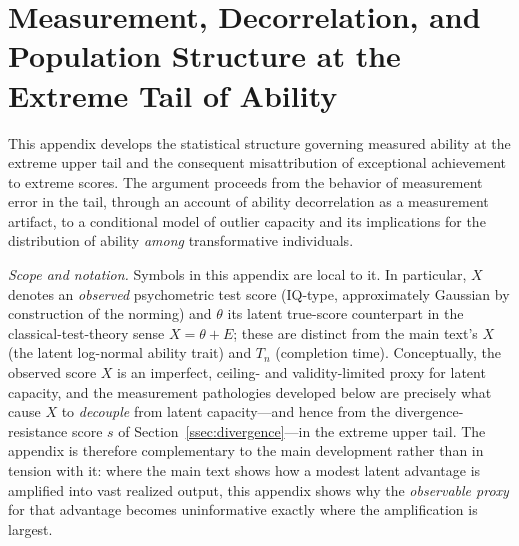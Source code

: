 \documentclass{article}
\begin{document}
\printbibliography

\appendix

\section{Measurement, Decorrelation, and Population Structure at the Extreme Tail of Ability}
\label{IQ_individual}

This appendix develops the statistical structure governing measured ability at the extreme upper tail and the consequent misattribution of exceptional achievement to extreme scores. The argument proceeds from the behavior of measurement error in the tail, through an account of ability decorrelation as a measurement artifact, to a conditional model of outlier capacity and its implications for the distribution of ability \emph{among} transformative individuals.

\medskip
\noindent\emph{Scope and notation.}\;
Symbols in this appendix are local to it. In particular, $X$ denotes an \emph{observed} psychometric test score (IQ-type, approximately Gaussian by construction of the norming) and $\theta$ its latent true-score counterpart in the classical-test-theory sense $X = \theta + E$; these are distinct from the main text's $X$ (the latent log-normal ability trait) and $T_n$ (completion time). Conceptually, the observed score $X$ is an imperfect, ceiling- and validity-limited proxy for latent capacity, and the measurement pathologies developed below are precisely what cause $X$ to \emph{decouple} from latent capacity---and hence from the divergence-resistance score $s$ of Section~\ref{ssec:divergence}---in the extreme upper tail. The appendix is therefore complementary to the main development rather than in tension with it: where the main text shows how a modest latent advantage is amplified into vast realized output, this appendix shows why the \emph{observable proxy} for that advantage becomes uninformative exactly where the amplification is largest.
\end{document}
